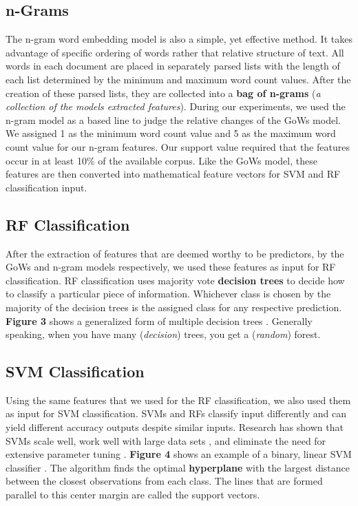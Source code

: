 \documentclass[twoside,twocolumn]{article}
\begin{document}
\subsection{n-Grams}
The n-gram word embedding model is also a simple, yet effective method. It takes advantage of specific ordering of words rather that relative structure of text. All words in each document are placed in separately parsed lists with the length of each list determined by the minimum and maximum word count values. After the creation of these parsed lists, they are collected into a \textbf{bag of n-grams} (\textit{a collection of the model\textquotesingle s extracted features}). During our experiments, we used the n-gram model as a based line to judge the relative changes of the GoWs model. We assigned 1 as the minimum word count value and 5 as the maximum word count value for our n-gram features. Our support value required that the features occur in at least 10\% of the available corpus. Like the GoWs model, these features are then converted into mathematical feature vectors for SVM and RF classification input.

\subsection{RF Classification}
After the extraction of features that are deemed worthy to be predictors, by the GoWs and n-gram models respectively, we used these features as input for RF classification. RF classification uses majority vote \textbf{decision trees} to decide how to classify a particular piece of information. Whichever class is chosen by the majority of the decision trees is the assigned class for any respective prediction. \textbf{Figure 3} shows a generalized form of multiple decision trees \cite{srivastava_shaikh_jain_gupta_gupta_2015}. Generally speaking, when you have many (\textit{decision}) trees, you get a (\textit{random}) forest.

\subsection{SVM Classification}
Using the same features that we used for the RF classification, we also used them as input for SVM classification. SVMs and RFs classify input differently and can yield different accuracy outputs despite similar inputs. Research has shown that SVMs scale well, work well with large data sets \cite{basu2003support}, and eliminate the need for extensive parameter tuning \cite{joachims1998text}. \textbf{Figure 4} shows an example of a binary, linear SVM classifier \cite{sforza_lippi_2013}. The algorithm finds the optimal \textbf{hyperplane} with the largest distance between the closest observations from each class. The lines that are formed parallel to this center margin are called the support vectors.
\end{document}
